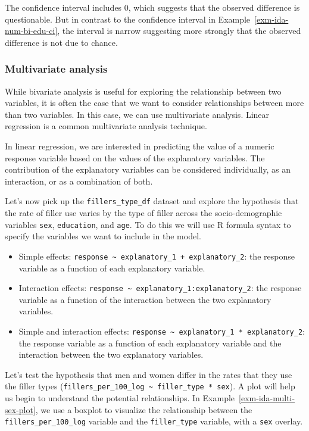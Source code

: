 \documentclass[
  letterpaper,
  DIV=11,
  numbers=noendperiod]{scrreprt}
\providecommand{\tightlist}{%
  \setlength{\itemsep}{0pt}\setlength{\parskip}{0pt}}\usepackage{longtable,booktabs,array}
\theoremstyle{definition}
\theoremstyle{remark}
\begin{document}
The confidence interval includes 0, which suggests that the observed
difference is questionable. But in contrast to the confidence interval
in Example~\ref{exm-ida-num-bi-edu-ci}, the interval is narrow
suggesting more strongly that the observed difference is not due to
chance.

\subsubsection{Multivariate analysis}\label{multivariate-analysis-1}

While bivariate analysis is useful for exploring the relationship
between two variables, it is often the case that we want to consider
relationships between more than two variables. In this case, we can use
multivariate analysis. Linear regression is a common multivariate
analysis technique.

In linear regression, we are interested in predicting the value of a
numeric response variable based on the values of the explanatory
variables. The contribution of the explanatory variables can be
considered individually, as an interaction, or as a combination of both.

Let's now pick up the \texttt{fillers\_type\_df} dataset and explore the
hypothesis that the rate of filler use varies by the type of filler
across the socio-demographic variables \texttt{sex}, \texttt{education},
and \texttt{age}. To do this we will use R formula syntax to specify the
variables we want to include in the model.

\begin{itemize}
\tightlist
\item
  Simple effects:
  \texttt{response\ \textasciitilde{}\ explanatory\_1\ +\ explanatory\_2}:
  the response variable as a function of each explanatory variable.
\item
  Interaction effects:
  \texttt{response\ \textasciitilde{}\ explanatory\_1:explanatory\_2}:
  the response variable as a function of the interaction between the two
  explanatory variables.
\item
  Simple and interaction effects:
  \texttt{response\ \textasciitilde{}\ explanatory\_1\ *\ explanatory\_2}:
  the response variable as a function of each explanatory variable and
  the interaction between the two explanatory variables.
\end{itemize}

Let's test the hypothesis that men and women differ in the rates that
they use the filler types
(\texttt{fillers\_per\_100\_log\ \textasciitilde{}\ filler\_type\ *\ sex}).
A plot will help us begin to understand the potential relationships. In
Example~\ref{exm-ida-multi-sex-plot}, we use a boxplot to visualize the
relationship between the \texttt{fillers\_per\_100\_log} variable and
the \texttt{filler\_type} variable, with a \texttt{sex} overlay.
\end{document}
